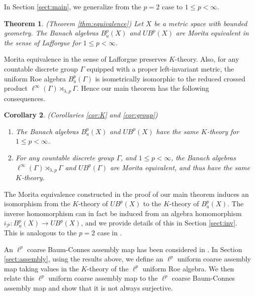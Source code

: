 \documentclass[a4,11pt]{amsart}
\newtheorem{thm}{Theorem}[section]
\newtheorem{cor}[thm]{Corollary}
\theoremstyle{remark}
\begin{document}
In Section \ref{sect:main}, we generalize \cite[Proposition 4.7]{SW13} from the $p=2$ case to $1\leq p<\infty$.
\begin{thm} (Theorem \ref{thm:equivalence})
Let $X$ be a metric space with bounded geometry.
The Banach algebras $B^p_u(X)$ and $UB^p(X)$ are Morita equivalent in the sense of Lafforgue for $1\leq p<\infty$.
\end{thm} 

Morita equivalence in the sense of Lafforgue preserves $K$-theory.
Also, for any countable discrete group $\Gamma$ equipped with a proper left-invariant metric, the uniform Roe algebra $B^p_u(\Gamma)$ is isometrically isomorphic to the reduced crossed product $\ell^\infty(\Gamma)\rtimes_{\lambda,p}\Gamma$.
Hence our main theorem has the following consequences.

\begin{cor} (Corollaries \ref{cor:K} and \ref{cor:group})
\begin{enumerate}
\item The Banach algebras $B^p_u(X)$ and $UB^p(X)$ have the same $K$-theory for $1\leq p<\infty$.
\item For any countable discrete group $\Gamma$, and $1\leq p<\infty$, the Banach algebras $\ell^\infty(\Gamma)\rtimes_{\lambda,p}\Gamma$ and $UB^p(\Gamma)$ are Morita equivalent, and thus have the same $K$-theory.
\end{enumerate}
\end{cor}

The Morita equivalence constructed in the proof of our main theorem induces an isomorphism from the $K$-theory of $UB^p(X)$ to the $K$-theory of $B^p_u(X)$.
The inverse homomorphism can in fact be induced from an algebra homomorphism $i_\mathcal{P}:B^p_u(X)\rightarrow UB^p(X)$, and we provide details of this in Section \ref{sect:inv}. This is analogous to the $p=2$ case in \cite[Proposition 4.8]{SW13}.

An $\ell^p$ coarse Baum-Connes assembly map has been considered in \cite{Chung23,SW,ZZ}. 
In Section \ref{sect:assembly}, using the results above, we define an $\ell^p$ uniform coarse assembly map taking values in the $K$-theory of the $\ell^p$ uniform Roe algebra.
We then relate this $\ell^p$ uniform coarse assembly map to the $\ell^p$ coarse Baum-Connes assembly map and show that it is not always surjective.


\end{document}
